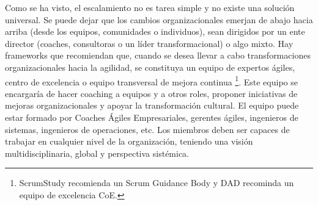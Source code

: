 Como se ha visto, el escalamiento no es tarea simple y no existe una solución universal. Se puede dejar que los cambios organizacionales emerjan de abajo hacia arriba (desde los equipos, comunidades o individuos), sean dirigidos por un ente director (coaches, consultoras o un líder transformacional) o algo mixto. Hay frameworks que recomiendan que, cuando se desea llevar a cabo transformaciones organizacionales hacia la agilidad, se constituya un equipo de expertos ágiles, centro de excelencia o equipo transversal de mejora continua \footnote{ScrumStudy recomienda un Scrum Guidance Body y DAD recominda un equipo de excelencia CoE.}. Este equipo se encargaría de hacer coaching a equipos y a otros roles, proponer iniciativas de mejoras organizacionales y apoyar la transformación cultural. El equipo puede estar formado por Coaches Ágiles Empresariales, gerentes ágiles, ingenieros de sistemas, ingenieros de operaciones, etc. Los miembros deben ser capaces de trabajar en cualquier nivel de la organización, teniendo una visión multidisciplinaria, global y perspectiva sistémica.
